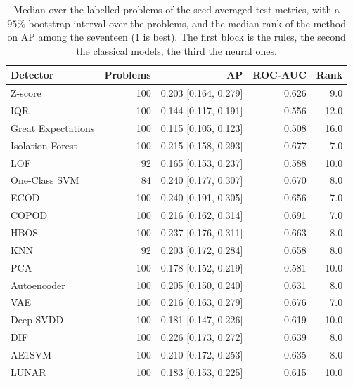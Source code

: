 \documentclass[conference]{IEEEtran}
\begin{document}
\begin{table}[t]
\caption{Median over the labelled problems of the seed-averaged test metrics,
with a $95\%$ bootstrap interval over the problems, and the median rank of the
method on AP among the seventeen (1 is best). The first block is the rules,
the second the classical models, the third the neural ones.}
\label{tab:labelled}
\centering
\footnotesize
\setlength{\tabcolsep}{3pt}
\begin{tabular}{lrrrr}
\toprule
Detector & Problems & AP & ROC-AUC & Rank \\
\midrule
Z-score            & 100 & 0.203 [0.164, 0.279] & 0.626 & 9.0 \\
IQR                & 100 & 0.144 [0.117, 0.191] & 0.556 & 12.0 \\
Great Expectations & 100 & 0.115 [0.105, 0.123] & 0.508 & 16.0 \\
\midrule
Isolation Forest   & 100 & 0.215 [0.158, 0.293] & 0.677 & 7.0 \\
LOF                & 92 & 0.165 [0.153, 0.237] & 0.588 & 10.0 \\
One-Class SVM      & 84 & 0.240 [0.177, 0.307] & 0.670 & 8.0 \\
ECOD               & 100 & 0.240 [0.191, 0.305] & 0.656 & 7.0 \\
COPOD              & 100 & 0.216 [0.162, 0.314] & 0.691 & 7.0 \\
HBOS               & 100 & 0.237 [0.176, 0.311] & 0.663 & 8.0 \\
KNN                & 92 & 0.203 [0.172, 0.284] & 0.658 & 8.0 \\
PCA                & 100 & 0.178 [0.152, 0.219] & 0.581 & 10.0 \\
\midrule
Autoencoder        & 100 & 0.205 [0.150, 0.240] & 0.631 & 8.0 \\
VAE                & 100 & 0.216 [0.163, 0.279] & 0.676 & 7.0 \\
Deep SVDD          & 100 & 0.181 [0.147, 0.226] & 0.619 & 10.0 \\
DIF                & 100 & 0.226 [0.173, 0.272] & 0.639 & 8.0 \\
AE1SVM             & 100 & 0.210 [0.172, 0.253] & 0.635 & 8.0 \\
LUNAR              & 100 & 0.183 [0.153, 0.225] & 0.615 & 10.0 \\
\bottomrule
\end{tabular}
\end{table}
\end{document}
